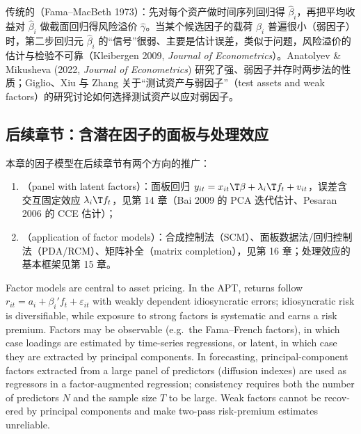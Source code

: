 传统的（Fama--MacBeth 1973）：先对每个资产做时间序列回归得 $\hat\beta_i$，再把平均收益对 $\hat\beta_i$ 做截面回归得风险溢价 $\hat\gamma$。当某个候选因子的载荷 $\beta_i$ 普遍很小（弱因子）时，第二步回归元 $\hat\beta_i$ 的“信号”很弱、主要是估计误差，类似于问题，风险溢价的估计与检验不可靠（Kleibergen 2009, \emph{Journal of Econometrics}）。Anatolyev \& Mikusheva (2022, \emph{Journal of Econometrics}) 研究了强、弱因子并存时两步法的性质；Giglio、Xiu 与 Zhang 关于“测试资产与弱因子”（test assets and weak factors）的研究讨论如何选择测试资产以应对弱因子。

\subsection{后续章节：含潜在因子的面板与处理效应}

本章的因子模型在后续章节有两个方向的推广：
\begin{enumerate}
\item {}（panel with latent factors）：面板回归 $y_{it}=x_{it}\T\beta+\lambda_i\T f_t+v_{it}$，误差含交互固定效应 $\lambda_i\T f_t$，见第 14 章（Bai 2009 的 PCA 迭代估计、Pesaran 2006 的 CCE 估计）；
\item {}（application of factor models）：合成控制法（SCM）、面板数据法/回归控制法（PDA/RCM）、矩阵补全（matrix completion），见第 16 章；处理效应的基本框架见第 15 章。
\end{enumerate}

\begin{english}
Factor models are central to asset pricing. In the APT, returns follow $r_{it}=a_i+\beta_i'f_t+\varepsilon_{it}$ with weakly dependent idiosyncratic errors; idiosyncratic risk is diversifiable, while exposure to strong factors is systematic and earns a risk premium. Factors may be observable (e.g.\ the Fama--French factors), in which case loadings are estimated by time-series regressions, or latent, in which case they are extracted by principal components. In forecasting, principal-component factors extracted from a large panel of predictors (diffusion indexes) are used as regressors in a factor-augmented regression; consistency requires both the number of predictors $N$ and the sample size $T$ to be large. Weak factors cannot be recovered by principal components and make two-pass risk-premium estimates unreliable.
\end{english}

